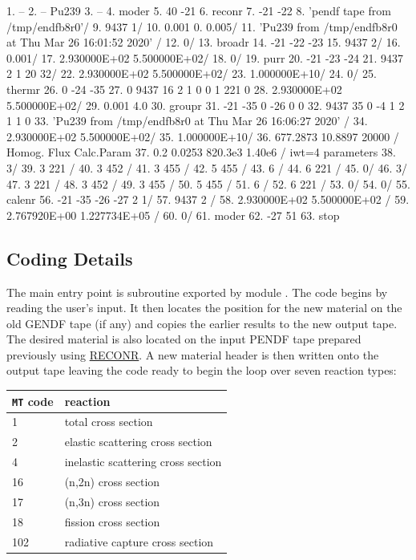 \small
\begin{ccode}
  1.   --
  2.   -- Pu239
  3.   --
  4.   moder
  5.    40 -21
  6.   reconr
  7.    -21 -22
  8.    'pendf tape from /tmp/endfb8r0'/
  9.    9437 1/
 10.    0.001  0.  0.005/
 11.    'Pu239 from /tmp/endfb8r0 at Thu Mar 26 16:01:52 2020' /
 12.    0/
 13.   broadr
 14.    -21 -22 -23
 15.    9437 2/
 16.    0.001/
 17.    2.930000E+02 5.500000E+02/
 18.    0/
 19.   purr
 20.    -21 -23 -24
 21.    9437 2 1 20 32/
 22.    2.930000E+02 5.500000E+02/
 23.    1.000000E+10/
 24.    0/
 25.   thermr
 26.    0 -24 -35
 27.    0 9437 16 2 1 0 0 1 221 0
 28.    2.930000E+02 5.500000E+02/
 29.    0.001 4.0
 30.   groupr
 31.    -21 -35 0 -26 0 0
 32.    9437 35 0 -4 1 2 1 1 0
 33.    'Pu239 from /tmp/endfb8r0 at Thu Mar 26 16:06:27 2020' /
 34.    2.930000E+02 5.500000E+02/
 35.    1.000000E+10/
 36.    677.2873 10.8897 20000 / Homog. Flux Calc.Param
 37.    0.2 0.0253 820.3e3 1.40e6 / iwt=4 parameters
 38.    3/
 39.    3 221 /
 40.    3 452 /
 41.    3 455 /
 42.    5 455 /
 43.    6 /
 44.    6 221 /
 45.    0/
 46.    3/
 47.    3 221 /
 48.    3 452 /
 49.    3 455 /
 50.    5 455 /
 51.    6 /
 52.    6 221 /
 53.    0/
 54.    0/
 55.   calenr
 56.    -21 -35 -26 -27 2 1/
 57.    9437 2 /
 58.    2.930000E+02 5.500000E+02 /
 59.    2.767920E+00 1.227734E+05 /
 60.    0/
 61.   moder
 62.    -27 51
 63.   stop
\end{ccode}
\normalsize

\subsection{Coding Details}
\label{ssCALENR_details}

The main entry point is subroutine  exported by
module .
The code begins by reading the user's input. It then locates the
position for the new material on the old GENDF
tape (if any) and copies the earlier results to the new output
tape. The desired material is also located on the input
PENDF tape prepared previously using
\hyperlink{sRECONRhy}{RECONR}.
A new material header is then written onto the output tape leaving
the code ready to begin the loop over seven reaction types:
\vskip 0.1cm
\begin{tabular}{| l | l |}
\hline
{\tt MT} code & reaction \\
\hline
1 & total cross section \\
2 & elastic scattering cross section\\
4 & inelastic scattering cross section\\
16 & (n,2n) cross section \\
17 & (n,3n) cross section \\
18 & fission cross section \\
102 & radiative capture cross section \\
\hline
\end{tabular}

